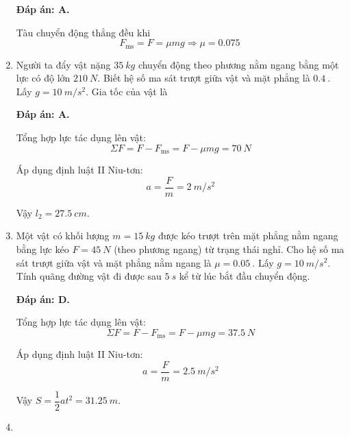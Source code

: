 \begin{enumerate}[label=\bfseries Câu \arabic*:]
\loigiai
{	\textbf{Đáp án: A.}
	
Tàu chuyển động thẳng đều khi
$$F_\text{ms} = F = \mu mg \Rightarrow \mu = \SI{0.075}{}$$
}

	\item {}
	
	\cauhoi
	{Người ta đẩy vật nặng $\SI{35}{kg}$ chuyển động theo phương nằm ngang bằng một lực có độ lớn $\SI{210}{N}$. Biết hệ số ma sát trượt giữa vật và mặt phẳng là $\SI{0.4}{}$. Lấy $g=\SI{10}{m/s^2}$. Gia tốc của vật là
	}
	
	\loigiai
	{	\textbf{Đáp án: A.}	
		
	Tổng hợp lực tác dụng lên vật:
	$$\Sigma F= F-F_\text{ms} = F - \mu mg = \SI{70}{N}$$
	
	Áp dụng định luật II Niu-tơn:
	$$a=\dfrac{F}{m} = \SI{2}{m/s^2}$$
		
		Vậy $l_2 = \SI{27.5}{cm}$.
	}
		\item {}
	
	\cauhoi
	{Một vật có khối lượng $m=\SI{15}{kg}$ được kéo trượt trên mặt phẳng nằm ngang bằng lực kéo $F=\SI{45}{N}$ (theo phương ngang) từ trạng thái nghỉ. Cho hệ số ma sát trượt giữa vật và mặt phẳng nằm ngang là $\mu = \SI{0.05}{}$. Lấy $g=\SI{10}{m/s^2}$. Tính quãng đường vật đi được sau $\SI{5}{s}$ kể từ lúc bắt đầu chuyển động.
	}
	
	\loigiai
	{	\textbf{Đáp án: D.}	
		
		Tổng hợp lực tác dụng lên vật:
	$$\Sigma F= F-F_\text{ms} = F - \mu mg = \SI{37.5}{N}$$
	
	Áp dụng định luật II Niu-tơn:
	$$a=\dfrac{F}{m} = \SI{2.5}{m/s^2}$$
	
	Vậy $S=\dfrac{1}{2}at^2 = \SI{31.25}{m}$.
	}
		\item {}


\end{enumerate}
